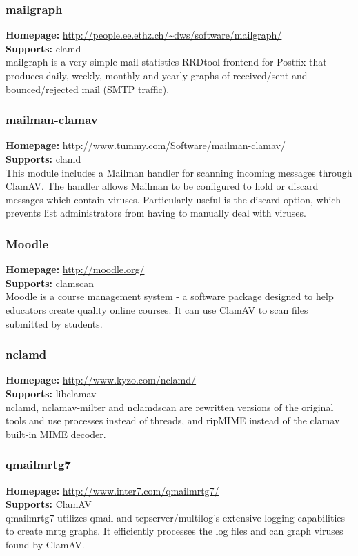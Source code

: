 \documentclass[a4paper,titlepage,12pt]{article}
\begin{document}
    \subsubsection{mailgraph}
    \textbf{Homepage:} \url{http://people.ee.ethz.ch/~dws/software/mailgraph/}\\
    \textbf{Supports:} clamd\\[4pt]
    mailgraph is a very simple mail statistics RRDtool frontend for Postfix
    that produces daily, weekly, monthly and yearly graphs of received/sent
    and bounced/rejected mail (SMTP traffic).

    \subsubsection{mailman-clamav}
    \textbf{Homepage:} \url{http://www.tummy.com/Software/mailman-clamav/}\\
    \textbf{Supports:} clamd\\[4pt]
    This module includes a Mailman handler for scanning incoming messages
    through ClamAV. The handler allows Mailman to be configured to hold or
    discard messages which contain viruses. Particularly useful is the
    discard option, which prevents list administrators from having to
    manually deal with viruses.

    \subsubsection{Moodle}
    \textbf{Homepage:} \url{http://moodle.org/}\\
    \textbf{Supports:} clamscan\\[4pt]
    Moodle is a course management system - a software package designed to help
    educators create quality online courses. It can use ClamAV to scan files
    submitted by students.

    \subsubsection{nclamd}
    \textbf{Homepage:} \url{http://www.kyzo.com/nclamd/}\\
    \textbf{Supports:} libclamav\\[4pt]
    nclamd, nclamav-milter and nclamdscan are rewritten versions of the
    original tools and use processes instead of threads, and ripMIME instead
    of the clamav built-in MIME decoder.

    \subsubsection{qmailmrtg7}
    \textbf{Homepage:} \url{http://www.inter7.com/qmailmrtg7/}\\
    \textbf{Supports:} ClamAV\\[4pt]
    qmailmrtg7 utilizes qmail and tcpserver/multilog's extensive logging
    capabilities to create mrtg graphs. It efficiently processes the log
    files and can graph viruses found by ClamAV.
\end{document}
